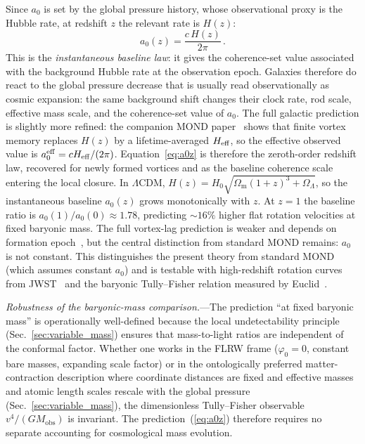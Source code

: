 \documentclass[aps,prd,onecolumn,superscriptaddress,nofootinbib,showpacs,12pt]{revtex4-2}
\newcommand{\azero}{a_{0}}
\begin{document}
Since $\azero$ is set by the global pressure history, whose
observational proxy is the Hubble rate, at redshift $z$
the relevant rate is $H(z)$:
\begin{equation}\label{eq:a0z}
  \boxed{\azero(z) = \frac{c\,H(z)}{2\pi}\,.}
\end{equation}
This is the \emph{instantaneous baseline law}: it gives the coherence-set
value associated with the background Hubble rate at the observation epoch.
Galaxies therefore do react to the global pressure decrease that is
usually read observationally as cosmic expansion: the same background
shift changes their clock rate, rod scale, effective mass scale, and the
coherence-set value of $\azero$.  The full galactic prediction is slightly
more refined: the companion MOND paper~\cite{Lotishvili2026MOND} shows that
finite vortex memory replaces $H(z)$ by a lifetime-averaged
$H_{\rm eff}$, so the effective observed value is
$\azero^{\rm eff}=cH_{\rm eff}/(2\pi)$.  Equation~\eqref{eq:a0z} is
therefore the zeroth-order redshift law, recovered for newly formed
vortices and as the baseline coherence scale entering the local closure.
In $\Lambda$CDM,
$H(z) = H_{0}\sqrt{\Omega_{\mathrm{m}}(1+z)^{3}
+ \Omega_{\Lambda}}$, so the instantaneous baseline
$\azero(z)$ grows monotonically with $z$.  At $z = 1$ the
baseline ratio is $\azero(1)/\azero(0) \approx 1.78$,
predicting ${\sim}16\%$ higher flat rotation velocities at
fixed baryonic mass.  The full vortex-lag prediction is
weaker and depends on formation epoch~\cite{Lotishvili2026MOND},
but the central distinction from standard MOND remains:
$\azero$ is not constant.
This distinguishes the present theory
from standard MOND (which assumes constant $\azero$)
and is testable with high-redshift rotation curves from
JWST~\cite{JWST2023} and the baryonic Tully--Fisher
relation measured by Euclid~\cite{Euclid2024}.

\textit{Robustness of the baryonic-mass comparison.}---The
prediction ``at fixed baryonic mass'' is operationally
well-defined because the local undetectability
principle (Sec.~\ref{sec:variable_mass}) ensures that
mass-to-light ratios are independent of the conformal
factor.  Whether one works in the FLRW frame
($\varphi_0=0$, constant bare masses, expanding scale
factor) or in the ontologically preferred
matter-contraction description where coordinate
distances are fixed and effective masses and atomic
length scales rescale with the global pressure
(Sec.~\ref{sec:variable_mass}), the dimensionless
Tully--Fisher observable $v^4/(GM_{\mathrm{obs}})$
is invariant.
The prediction~(\ref{eq:a0z}) therefore requires no
separate accounting for cosmological mass evolution.
\end{document}
